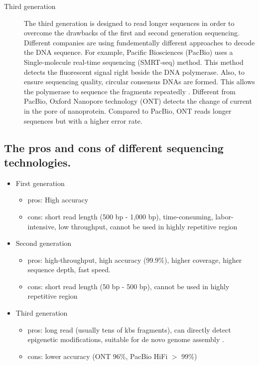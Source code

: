 \documentclass{article}
\begin{document}
\begin{description}
    \item[Third generation] The third generation is designed to read longer sequences in order to overcome the drawbacks of the first and second generation sequencing. Different companies are using fundementally different approaches to decode the DNA sequence. For example, Pacific Biosciences (PacBio) uses a Single-molecule real-time sequencing (SMRT-seq) method. This method detects the fluorescent signal right beside the DNA polymerase. Also, to ensure sequencing quality, circular consensus DNAs are formed. This allows the polymerase to sequence the fragments repeatedly \cite{ccs}. Different from PacBio, Oxford Nanopore technology (ONT) detects the change of current in the pore of nanoprotein. Compared to PacBio, ONT reads longer sequences but with a higher error rate.
\end{description}
\subsection{The pros and cons of different sequencing technologies.} 
    \begin{itemize}
        \item First generation
        \begin{itemize}
            \item pros: High accuracy
            \item cons: short read length (500 bp - 1,000 bp), time-consuming, labor-intensive, low throughput, cannot be used in highly repetitive region
        \end{itemize}
        \item Second generation
        \begin{itemize}
            \item pros: high-throughput, high accuracy (99.9\%), higher coverage, higher sequence depth, fast speed.
            \item cons: short read length (50 bp - 500 bp), cannot be used in highly repetitive region
        \end{itemize}
        \item Third generation
        \begin{itemize}
            \item pros: long read (usually tens of kbs fragments), can directly detect epigenetic modifications, suitable for de novo genome assembly \cite{hifi}.
            \item cons: lower accuracy (ONT 96\%, PacBio HiFi $>$ 99\%)
        \end{itemize}
    \end{itemize}
\end{document}

